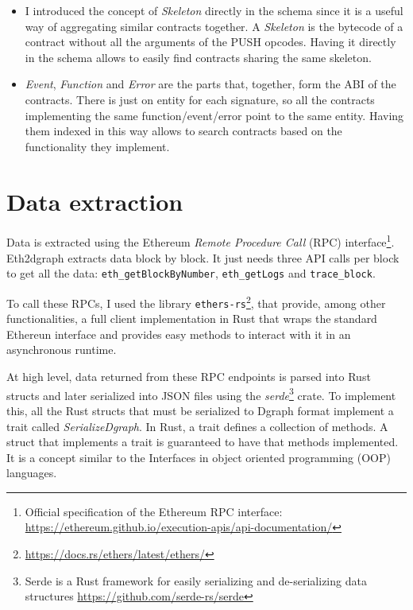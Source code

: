 \begin{itemize}
    \item I introduced the concept of \textit{Skeleton} directly in the schema since it is a useful way of aggregating similar contracts together. A \textit{Skeleton} is the bytecode of a contract without all the arguments of the PUSH opcodes. Having it directly in the schema allows to easily find contracts sharing the same skeleton.

    \item \textit{Event}, \textit{Function} and \textit{Error} are the parts that, together, form the ABI of the contracts. There is just on entity for each signature, so all the contracts implementing the same function/event/error point to the same entity. Having them indexed in this way allows to search contracts based on the functionality they implement.
    
\end{itemize}

\section{Data extraction}

Data is extracted using the Ethereum \textit{Remote Procedure Call} (RPC) interface\footnote{Official specification of the Ethereum RPC interface: \url{https://ethereum.github.io/execution-apis/api-documentation/}}. Eth2dgraph extracts data block by block. It just needs three API calls per block to get all the data: \texttt{eth\_getBlockByNumber}, \texttt{eth\_getLogs} and \texttt{trace\_block}. 

To call these RPCs, I used the library \texttt{ethers-rs}\footnote{\url{https://docs.rs/ethers/latest/ethers/}}, that provide, among other functionalities, a full client implementation in Rust that wraps the standard Ethereun interface and provides easy methods to interact with it in an asynchronous runtime.

At high level, data returned from these RPC endpoints is parsed into Rust structs and later serialized into JSON files using the \textit{serde}\footnote{Serde is a Rust framework for easily serializing and de-serializing data structures \url{https://github.com/serde-rs/serde}} crate. To implement this, all the Rust structs that must be serialized to Dgraph format implement a trait called \textit{SerializeDgraph}. In Rust, a trait defines a collection of methods. A struct that implements a trait is guaranteed to have that methods implemented. It is a concept similar to the Interfaces in object oriented programming (OOP) languages.

